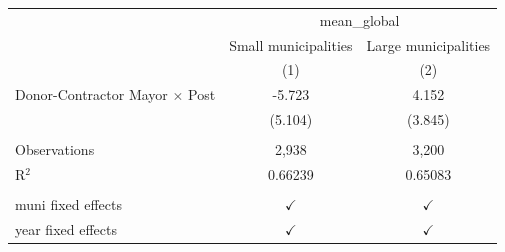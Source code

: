 
\begingroup
\centering
\begin{tabular}{lcc}
   \toprule
    & \multicolumn{2}{c}{mean\_global}\\
                                         & Small municipalities & Large municipalities \\   
                                         & (1)                  & (2)\\  
   \midrule 
   Donor-Contractor Mayor $\times$ Post  & -5.723               & 4.152\\   
                                         & (5.104)              & (3.845)\\   
    \\
   Observations                          & 2,938                & 3,200\\  
   R$^2$                                 & 0.66239              & 0.65083\\  
    \\
   muni fixed effects                    & $\checkmark$         & $\checkmark$\\   
   year fixed effects                    & $\checkmark$         & $\checkmark$\\   
   \bottomrule
\end{tabular}
\par\endgroup


